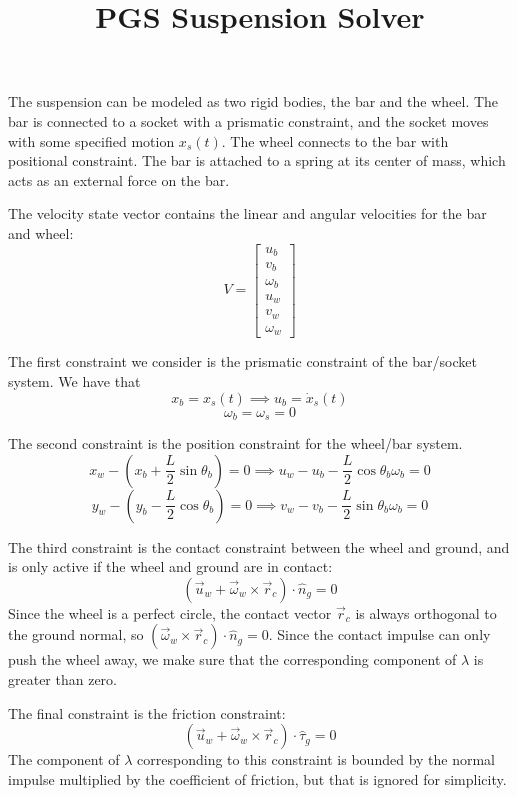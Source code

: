 \documentclass[9pt]{article}
\title{PGS Suspension Solver}
\begin{document}
\maketitle

The suspension can be modeled as two rigid bodies, the bar and the wheel. The bar is connected to a socket with a prismatic constraint, and the socket moves with some specified motion $x_s(t)$. The wheel connects to the bar with positional constraint. The bar is attached to a spring at its center of mass, which acts as an external force on the bar.

The velocity state vector contains the linear and angular velocities for the bar and wheel:
\[
V = 
\left[
\begin{array}{c}
u_b \\
v_b \\
\omega_b \\
u_w \\
v_w \\
\omega_w
\end{array} 
\right]
\]

The first constraint we consider is the prismatic constraint of the bar/socket system. We have that 
\[
x_b = x_s(t) \implies u_b = \dot{x}_s(t)
\]
\[
\omega_b = \omega_s = 0
\]

The second constraint is the position constraint for the wheel/bar system. 
\[
x_w - \left(x_b + \frac{L}{2}\sin \theta_b\right) = 0 \implies u_w - u_b - \frac{L}{2}\cos \theta_b \omega_b = 0
\]
\[
y_w - \left(y_b - \frac{L}{2}\cos \theta_b\right) = 0 \implies v_w - v_b - \frac{L}{2}\sin \theta_b \omega_b = 0
\]

The third constraint is the contact constraint between the wheel and ground, and is only active if the wheel and ground are in contact:
\[
(\vec{u}_w + \vec{\omega}_w \times \vec{r}_c) \cdot \hat{n}_g = 0
\]
Since the wheel is a perfect circle, the contact vector $\vec{r}_c$ is always orthogonal to the ground normal, so $(\vec{\omega}_w \times \vec{r}_c) \cdot \hat{n}_g = 0$. Since the contact impulse can only push the wheel away, we make sure that the corresponding component of $\lambda$ is greater than zero.

The final constraint is the friction constraint: 
\[
(\vec{u}_w + \vec{\omega}_w \times \vec{r}_c) \cdot \hat{\tau}_g = 0
\]
The component of $\lambda$ corresponding to this constraint is bounded by the normal impulse multiplied by the coefficient of friction, but that is ignored for simplicity.
\end{document}

